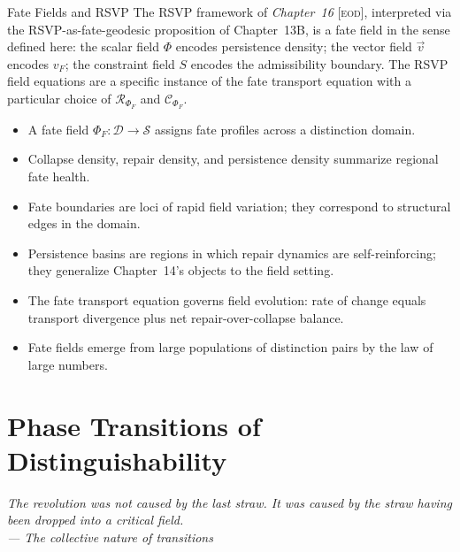 \documentclass[12pt,twoside,openright]{book}
\newcommand{\fateSpace}{\mathcal{S}}
\newcommand{\EOD}[1]{\textit{#1} [\textsc{eod}]}
\newenvironment{epigraph}[2]{%
  \vspace{1em}\begin{flushright}
  \begin{minipage}{0.72\textwidth}
  \itshape\small #1\\[0.4em]
  \upshape\footnotesize\sffamily\color{DistGray}--- #2
  \end{minipage}\end{flushright}\vspace{1.5em}}{}
\newenvironment{chapsummary}{%
  \begin{tcolorbox}[colback=DistBlue!5,colframe=DistBlue,
    title={\faBookOpen\enspace Summary},
    fonttitle=\sffamily\bfseries\color{white},
    attach boxed title to top left={yshift=-2mm,xshift=4mm},
    boxed title style={colback=DistBlue,rounded corners}]
  \begin{itemize}[nosep,leftmargin=*]}{%
  \end{itemize}\end{tcolorbox}}
\providecommand{\fateField}{\Phi_{F}}
\providecommand{\fateVelField}{v_{F}}
\begin{document}
\begin{trilogylink}{Fate Fields and RSVP}
The RSVP framework of \EOD{Chapter~16}, interpreted via the
RSVP-as-fate-geodesic proposition of Chapter~13B, is a fate
field in the sense defined here: the scalar field $\Phi$
encodes persistence density; the vector field $\vec{v}$ encodes
$\fateVelField$; the constraint field $S$ encodes the
admissibility boundary. The RSVP field equations are a specific
instance of the fate transport equation with a particular choice
of $\mathcal{R}_{\fateField}$ and $\mathcal{C}_{\fateField}$.
\end{trilogylink}

\begin{chapsummary}
\item A fate field $\fateField:\mathcal{D}\to\fateSpace$ assigns
  fate profiles across a distinction domain.
\item Collapse density, repair density, and persistence density
  summarize regional fate health.
\item Fate boundaries are loci of rapid field variation;
  they correspond to structural edges in the domain.
\item Persistence basins are regions in which repair dynamics
  are self-reinforcing; they generalize Chapter~14's objects
  to the field setting.
\item The fate transport equation governs field evolution:
  rate of change equals transport divergence plus net
  repair-over-collapse balance.
\item Fate fields emerge from large populations of distinction
  pairs by the law of large numbers.
\end{chapsummary}


\chapter{Phase Transitions of Distinguishability}
\label{ch:phase-transitions}

\begin{epigraph}{The revolution was not caused by the last
  straw. It was caused by the straw having been dropped into
  a critical field.}{The collective nature of transitions}
\end{epigraph}
\end{document}
